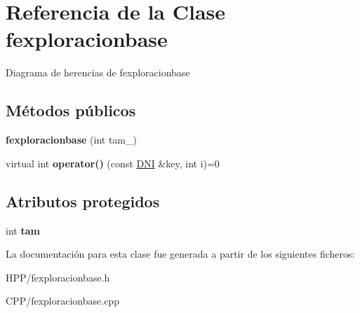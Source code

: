 \hypertarget{classfexploracionbase}{}\section{Referencia de la Clase fexploracionbase}
\label{classfexploracionbase}


Diagrama de herencias de fexploracionbase
\subsection*{Métodos públicos}
\begin{DoxyCompactItemize}
\item 
\mbox{\label{classfexploracionbase_ab2366227bfa944e8a85def0514c3c53b}} 
{\bfseries fexploracionbase} (int tam\+\_\+)
\item 
\mbox{\label{classfexploracionbase_a5f1242f6c1a4e49ce0afd1e7ec60f37b}} 
virtual int {\bfseries operator()} (const \hyperlink{classDNI}{D\+NI} \&key, int i)=0
\end{DoxyCompactItemize}
\subsection*{Atributos protegidos}
\begin{DoxyCompactItemize}
\item 
\mbox{\label{classfexploracionbase_a4d0f640eb4fc77be09ecc180265bdfa4}} 
int {\bfseries tam}
\end{DoxyCompactItemize}


La documentación para esta clase fue generada a partir de los siguientes ficheros\+:\begin{DoxyCompactItemize}
\item 
H\+P\+P/fexploracionbase.\+h\item 
C\+P\+P/fexploracionbase.\+cpp\end{DoxyCompactItemize}
